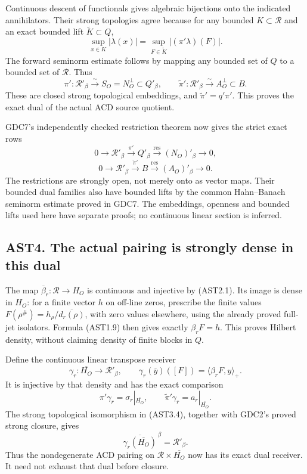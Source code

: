 Continuous descent of functionals gives algebraic bijections onto the
indicated annihilators. Their strong topologies agree because for any
bounded \(K\subset\mathcal R\) and an exact bounded lift
\(\widetilde K\subset Q\), \[
\sup_{x\in K}|\lambda(x)|
=\sup_{F\in\widetilde K}|(\pi'\lambda)(F)|.
\tag{AST3.3}
\] The forward seminorm estimate follows by mapping any bounded set of
\(Q\) to a bounded set of \(\mathcal R\). Thus \[
\boxed{\pi':\mathcal R'_\beta\xrightarrow{\sim}S_O=N_O^\perp
\subset Q'_\beta,\qquad
\widetilde\pi':\mathcal R'_\beta\xrightarrow{\sim}A_O^\perp
\subset B.}
\tag{AST3.4}
\] These are closed strong topological embeddings, and
\(\widetilde\pi'=q'\pi'\). This proves the exact dual of the actual ACD
source quotient.

GDC7's independently checked restriction theorem now gives the strict
exact rows \[
0\to\mathcal R'_\beta\xrightarrow{\pi'}Q'_\beta
\xrightarrow{\mathrm{res}}(N_O)'_\beta\to0,
\] \[
0\to\mathcal R'_\beta\xrightarrow{\widetilde\pi'}B
\xrightarrow{\mathrm{res}}(A_O)'_\beta\to0.
\tag{AST3.5}
\] The restrictions are strongly open, not merely onto as vector maps.
Their bounded dual families also have bounded lifts by the common
Hahn--Banach seminorm estimate proved in GDC7. The embeddings, openness
and bounded lifts used here have separate proofs; no continuous linear
section is inferred.

\subsection{AST4. The actual pairing is strongly dense in this
dual}\label{ast4.-the-actual-pairing-is-strongly-dense-in-this-dual}

The map \(\overline\beta_r:\mathcal R\to H_O\) is continuous and
injective by (AST2.1). Its image is dense in \(H_O\): for a finite
vector \(h\) on off-line zeros, prescribe the finite values
\(F(\rho^\#)=h_\rho/\overline{d_r(\rho)}\), with zero values elsewhere,
using the already proved full-jet isolators. Formula (AST1.9) then gives
exactly \(\beta_rF=h\). This proves Hilbert density, without claiming
density of finite blocks in \(Q\).

Define the continuous linear transpose receiver \[
\gamma_r:\overline{H_O}\to\mathcal R'_\beta,
\qquad
\gamma_r(\overline y)([F])=\langle\beta_rF,y\rangle_+.
\tag{AST4.1}
\] It is injective by that density and has the exact comparison \[
\pi'\gamma_r=\sigma_r|_{\overline{H_O}},\qquad
\widetilde\pi'\gamma_r=a_r|_{\overline{H_O}}.
\tag{AST4.2}
\] The strong topological isomorphism in (AST3.4), together with GDC2's
proved strong closure, gives \[
\overline{\gamma_r(\overline{H_O})}^{\,\beta}=\mathcal R'_\beta.
\tag{AST4.3}
\] Thus the nondegenerate ACD pairing on
\(\mathcal R\times\overline{H_O}\) now has its exact dual receiver. It
need not exhaust that dual before closure.

